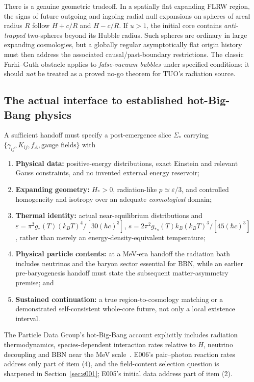 \documentclass[11pt,a4paper]{article}
\theoremstyle{tmon}
\theoremstyle{definition}
\begin{document}
There is a genuine geometric tradeoff. In a spatially flat expanding FLRW region, the signs of future outgoing and ingoing radial null expansions on spheres of areal radius $R$ follow $H+c/R$ and $H-c/R$. If $u>1$, the initial core contains \emph{anti-trapped} two-spheres beyond its Hubble radius. Such spheres are ordinary in large expanding cosmologies, but a globally regular asymptotically flat origin history must then address the associated causal/past-boundary restrictions. The classic Farhi--Guth obstacle applies to \emph{false-vacuum bubbles} under specified conditions; it should \emph{not} be treated as a proved no-go theorem for TUO's radiation source.

\subsection{The actual interface to established hot-Big-Bang physics}
A sufficient handoff must specify a post-emergence slice $\Sigma_*$ carrying $\{\gamma_{ij},K_{ij},f_A,\text{gauge fields}\}$ with
\begin{enumerate}
\item \textbf{Physical data:} positive-energy distributions, exact Einstein and relevant Gauss constraints, and no invented external energy reservoir;
\item \textbf{Expanding geometry:} $H_*>0$, radiation-like $p\simeq\varepsilon/3$, and controlled homogeneity and isotropy over an adequate \emph{cosmological} domain;
\item \textbf{Thermal identity:} actual near-equilibrium distributions and $\varepsilon=\pi^2g_*(T)(k_BT)^4/[30(\hbar c)^3]$, $s=2\pi^2g_{*s}(T)k_B(k_BT)^3/[45(\hbar c)^3]$, rather than merely an energy-density-equivalent temperature;
\item \textbf{Physical particle contents:} at a MeV-era handoff the radiation bath includes neutrinos and the baryon sector essential for BBN, while an earlier pre-baryogenesis handoff must state the subsequent matter-asymmetry premise; and
\item \textbf{Sustained continuation:} a true region-to-cosmology matching or a demonstrated self-consistent whole-core future, not only a local existence interval.
\end{enumerate}
The Particle Data Group's hot-Big-Bang account explicitly includes radiation thermodynamics, species-dependent interaction rates relative to $H$, neutrino decoupling and BBN near the MeV scale~\cite{PDGHot2025}. E006's pair--photon reaction rates address only part of item (4), and the field-content selection question is sharpened in Section~\ref{sec:s001}; E005's initial data address part of item (2).
\end{document}
